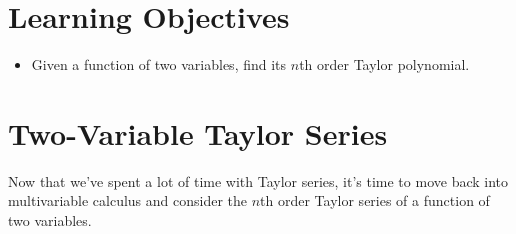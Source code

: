 \documentclass[
]{book}
\providecommand{\tightlist}{%
  \setlength{\itemsep}{0pt}\setlength{\parskip}{0pt}}
\theoremstyle{definition}
\theoremstyle{definition}
\theoremstyle{definition}
\theoremstyle{definition}
\theoremstyle{remark}
\begin{document}
\hypertarget{learning-objectives-33}{%
\section{Learning Objectives}\label{learning-objectives-33}}

\begin{itemize}
\tightlist
\item
  Given a function of two variables, find its \(n\)th order Taylor polynomial.
\end{itemize}

\hypertarget{two-variable-taylor-series}{%
\section{Two-Variable Taylor Series}\label{two-variable-taylor-series}}

Now that we've spent a lot of time with Taylor series, it's time to move back into multivariable calculus and consider the \(n\)th order Taylor series of a function of two variables.

  
\end{document}
